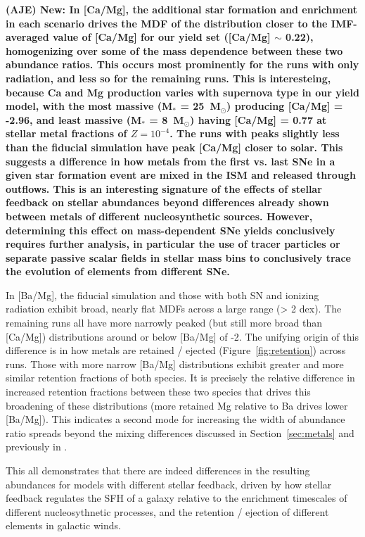 \documentclass[twocolumn]{aastex62}
\begin{document}
\textbf{(AJE) New:
In [Ca/Mg], the additional star formation and enrichment in each scenario drives the MDF of the distribution closer to the IMF-averaged value of [Ca/Mg] for our yield set ([Ca/Mg] $\sim$ 0.22), homogenizing over some of the mass dependence between these two abundance ratios. This occurs most prominently for the runs with only radiation, and less so for the remaining runs. This is interesteing, because Ca and Mg production varies with supernova type in our yield model, with the most massive (M$_*$ = 25~M$_{\odot}$) producing [Ca/Mg] = -2.96, and least massive (M$_*$ = 8~M$_{\odot}$) having [Ca/Mg] = 0.77 at stellar metal fractions of $Z = 10^{-4}$. The runs with peaks slightly less than the fiducial simulation have peak [Ca/Mg] closer to solar. This suggests a difference in how metals from the first vs. last SNe in a given star formation event are mixed in the ISM and released through outflows. This is an interesting signature of the effects of stellar feedback on stellar abundances beyond differences already shown between metals of different nucleosynthetic sources. However, determining this effect on mass-dependent SNe yields conclusively requires further analysis, in particular the use of tracer particles or separate passive scalar fields in stellar mass bins to conclusively trace the evolution of elements from different SNe.}

In [Ba/Mg], the fiducial simulation and those with both SN and ionizing radiation exhibit broad, nearly flat MDFs across a large range (> 2 dex). The remaining runs all have more narrowly peaked (but still more broad than [Ca/Mg]) distributions around or below [Ba/Mg] of -2. The unifying origin of this difference is in how metals are retained / ejected (Figure~\ref{fig:retention}) across runs. Those with more narrow [Ba/Mg] distributions exhibit greater and more similar retention fractions of both species. It is precisely the relative difference in increased retention fractions between these two species that drives this broadening of these distributions (more retained Mg relative to Ba drives lower [Ba/Mg]). This indicates a second mode for increasing the width of abundance ratio spreads beyond the mixing differences discussed in Section~\ref{sec:metals} and previously in \citet{Emerick2018b}.

This all demonstrates that there are indeed differences in the resulting abundances for models with different stellar feedback, driven by how stellar feedback regulates the SFH of a galaxy relative to the enrichment timescales of different nucleosythnetic processes, and the retention / ejection of different elements in galactic winds.
\end{document}
